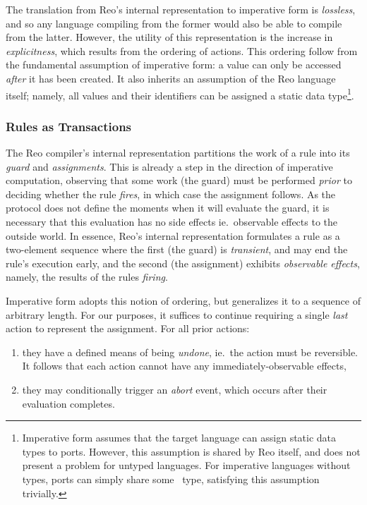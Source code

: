 The translation from Reo's internal representation to imperative form is \textit{lossless}, and so any language compiling from the former would also be able to compile from the latter. However, the utility of this representation is the increase in \textit{explicitness}, which results from the ordering of actions. This ordering follow from the fundamental assumption of imperative form: a value can only be accessed \textit{after} it has been created. It also inherits an assumption of the Reo language itself; namely, all values and their identifiers can be assigned a static data type\footnote{Imperative form assumes that the target language can assign static data types to ports. However, this assumption is shared by Reo itself, and does not present a problem for untyped languages. For imperative languages without types, ports can simply share some~ type, satisfying this assumption trivially.}.

\subsubsection{Rules as Transactions}

The Reo compiler's internal representation partitions the work of a rule into its \textit{guard} and \textit{assignments}. This is already a step in the direction of imperative computation, observing that some work (the guard) must be performed \textit{prior} to deciding whether the rule \textit{fires}, in which case the assignment follows. As the protocol does not define the moments when it will evaluate the guard, it is necessary that this evaluation has no side effects ie.\ observable effects to the outside world. In essence, Reo's internal representation formulates a rule as a two-element sequence where the first (the guard) is \textit{transient}, and may end the rule's execution early, and the second (the assignment) exhibits \textit{observable effects}, namely, the results of the rules \textit{firing}.

Imperative form adopts this notion of ordering, but generalizes it to a sequence of arbitrary length. For our purposes, it suffices to continue requiring a single \textit{last} action to represent the assignment. For all prior actions:
\begin{enumerate}
	\item they have a defined means of being \textit{undone}, ie.\ the action must be reversible. It follows that each action cannot have any immediately-observable effects,
	\item they may conditionally trigger an \textit{abort} event, which occurs after their evaluation completes.
\end{enumerate}

